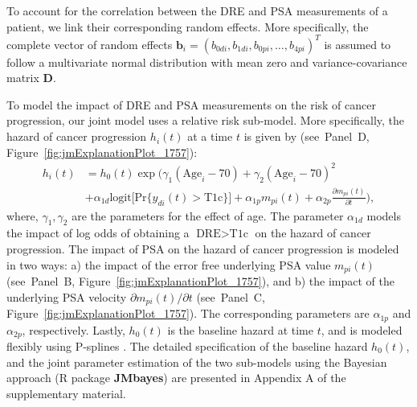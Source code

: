 To account for the correlation between the DRE and PSA measurements of a patient, we link their corresponding random effects. More specifically, the complete vector of random effects ${\boldsymbol{b}_i = (b_{0di}, b_{1di}, b_{0pi}, \ldots, b_{4pi})^T}$ is assumed to follow a multivariate normal distribution with mean zero and variance-covariance matrix $\boldsymbol{D}$.

To model the impact of DRE and PSA measurements on the risk of cancer progression, our joint model uses a relative risk sub-model. More specifically, the hazard of cancer progression $h_i(t)$ at a time $t$ is given by (see~Panel~D, Figure~\ref{fig:jmExplanationPlot_1757}):
\begin{equation}
\label{eq:rel_risk_model}
\begin{split}
    h_i(t) &= h_0(t) \exp\Big(\gamma_1 (\mbox{Age}_i-70) + \gamma_2 (\mbox{Age}_i-70)^2\\
    &+\alpha_{1d} \mbox{logit} \big[\mbox{Pr}\{y_{di}(t) > \mbox{T1c}\}\big]+ \alpha_{1p} m_{pi}(t) + \alpha_{2p} \frac{\partial m_{pi}(t)}{\partial {t}}\Big),
    \end{split}
\end{equation}
where, $\gamma_1, \gamma_2$ are the parameters for the effect of age. The parameter $\alpha_{1d}$ models the impact of log odds of obtaining a $\mbox{DRE} > \mbox{T1c}$ on the hazard of cancer progression. The impact of PSA on the hazard of cancer progression is modeled in two ways: a) the impact of the error free underlying PSA value $m_{pi}(t)$ (see~Panel~B, Figure~\ref{fig:jmExplanationPlot_1757}), and b) the impact of the underlying PSA velocity $\partial m_{pi}(t)/\partial {t}$ (see~Panel~C, Figure~\ref{fig:jmExplanationPlot_1757}). The corresponding parameters are $\alpha_{1p}$ and $\alpha_{2p}$, respectively. Lastly, $h_0(t)$ is the baseline hazard at time $t$, and is modeled flexibly using P-splines \citep{eilers1996flexible}. The detailed specification of the baseline hazard $h_0(t)$, and the joint parameter estimation of the two sub-models using the Bayesian approach (R package \textbf{JMbayes}\cite{rizopoulosJMbayes}) are presented in Appendix A of the supplementary material.
